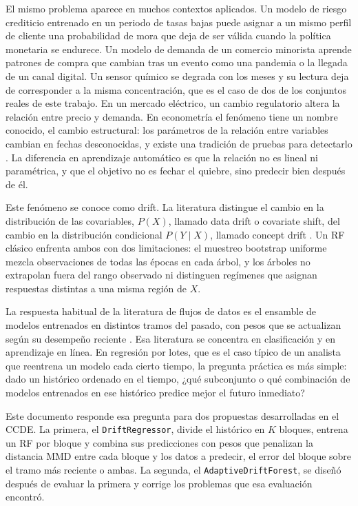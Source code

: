 \documentclass[11pt,a4paper]{article}
\begin{document}
El mismo problema aparece en muchos contextos aplicados. Un modelo de riesgo crediticio entrenado en
un periodo de tasas bajas puede asignar a un mismo perfil de cliente una probabilidad de mora que deja
de ser válida cuando la política monetaria se endurece. Un modelo de demanda de un comercio minorista
aprende patrones de compra que cambian tras un evento como una pandemia o la llegada de un canal
digital. Un sensor químico se degrada con los meses y su lectura deja de corresponder a la misma
concentración, que es el caso de dos de los conjuntos reales de este trabajo. En un mercado eléctrico,
un cambio regulatorio altera la relación entre precio y demanda. En econometría el fenómeno tiene un
nombre conocido, el cambio estructural: los parámetros de la relación entre variables cambian en
fechas desconocidas, y existe una tradición de pruebas para detectarlo
\parencite{andrews1993,baiperron1998}. La diferencia en aprendizaje automático es que la relación no
es lineal ni paramétrica, y que el objetivo no es fechar el quiebre, sino predecir bien después de
él.

Este fenómeno se conoce como drift. La literatura distingue el cambio en la distribución de las
covariables, $P(X)$, llamado data drift o covariate shift, del cambio en la distribución condicional
$P(Y\mid X)$, llamado concept drift \parencite{gama2014,morenotorres2012}. Un RF clásico
\parencite{breiman2001} enfrenta ambos con dos limitaciones: el muestreo bootstrap uniforme mezcla
observaciones de todas las épocas en cada árbol, y los árboles no extrapolan fuera del rango
observado ni distinguen regímenes que asignan respuestas distintas a una misma región de $X$.

La respuesta habitual de la literatura de flujos de datos es el ensamble de modelos entrenados en
distintos tramos del pasado, con pesos que se actualizan según su desempeño reciente
\parencite{kolter2007,elwell2011,gomes2017}. Esa literatura se concentra en clasificación y en
aprendizaje en línea. En regresión por lotes, que es el caso típico de un analista que reentrena un
modelo cada cierto tiempo, la pregunta práctica es más simple: dado un histórico ordenado en el
tiempo, ¿qué subconjunto o qué combinación de modelos entrenados en ese histórico predice mejor el
futuro inmediato?

Este documento responde esa pregunta para dos propuestas desarrolladas en el CCDE. La primera, el
\texttt{DriftRegressor}, divide el histórico en $K$ bloques, entrena un RF por bloque y combina sus
predicciones con pesos que penalizan la distancia MMD \parencite{gretton2012} entre cada bloque y los
datos a predecir, el error del bloque sobre el tramo más reciente o ambas. La segunda, el
\texttt{AdaptiveDriftForest}, se diseñó después de evaluar la primera y corrige los problemas que esa
evaluación encontró.
\end{document}
